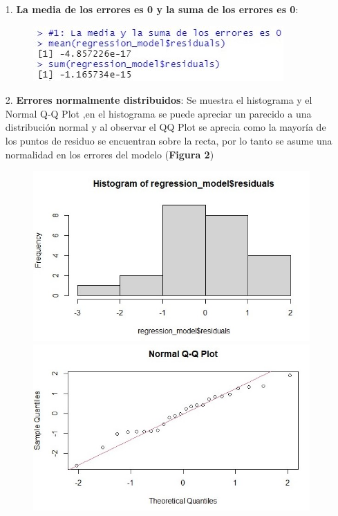 \documentclass[a4paper,10pt,twocolumn]{article}
\begin{document}
\begin{enumerate}
	\item[1.] \textbf{La media de los errores es 0 y la suma de los errores es 0}:

\begin{figure}[h]
	\includegraphics[scale=0.8]{./imgs/reg_1.jpg}
\end{figure}

	
	\item[2.] \textbf{Errores normalmente distribuidos}:
	Se muestra el histograma y el Normal Q-Q Plot ,en el histograma se puede apreciar un parecido a una distribuci\'on normal y al observar el QQ Plot se aprecia como la mayoría de los puntos de residuo se encuentran sobre la recta, por lo tanto se asume una normalidad en los errores del modelo (\textbf{Figura 2})
	
	\begin{figure}[h]
		\includegraphics[scale=0.5]{./imgs/reg_2_hist.jpg}
		\includegraphics[scale=0.5]{./imgs/reg_2_qq.jpg}
		\caption{}
	\end{figure}
	

\end{enumerate}
\end{document}
